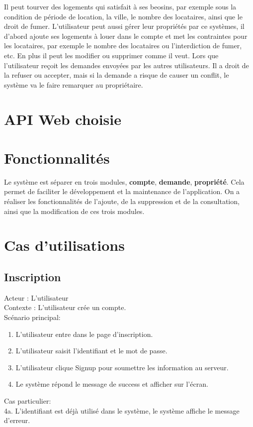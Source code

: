 \documentclass[14px]{article}
\begin{document}
Il peut tourver des logements qui satisfait à ses beosins, par exemple sous la condition de période de location, la ville, le nombre des locataires, ainsi que le droit de fumer.
L'utilisateur peut aussi gérer leur propriétés par ce systèmes, il d'abord ajoute ses logements à louer dans le compte et met les contraintes pour les locataires, par exemple le nombre des locataires ou l'interdiction de fumer, etc.  En plus il peut les modifier ou supprimer comme il veut. Lors que l'utilisateur reçoit les demandes envoyées par les autres utilisateurs. Il a droit de la refuser ou accepter, mais si la demande a risque de causer un conflit, le système va le faire remarquer au propriétaire.
 
\section{API Web choisie}

\section{Fonctionnalités}
Le système est séparer en trois modules, \textbf{compte}, \textbf{demande}, \textbf{propriété}. Cela permet de faciliter le développement et la maintenance de l'application. On a réaliser les fonctionnalités de l'ajoute, de la suppression et de la consultation, ainsi que la modification de ces trois modules. 

\section{Cas d'utilisations}
\subsection{Inscription}
Acteur : L'utilisateur\\
Contexte : L'utilisateur crée un compte.\\
Scénario principal: 
\begin{enumerate}
	\item L'utilisateur entre dans le page d'inscription.
	\item L'utilisateur saisit l'identifiant et le mot de passe.
	\item L'utilisateur clique Signup pour soumettre les information au serveur.
	\item Le système répond le message de success et afficher sur l'écran.	
\end{enumerate}
Cas particulier:\\
4a. L'identifiant est déjà utilisé dans le système, le système affiche le message d'erreur.
\end{document}
